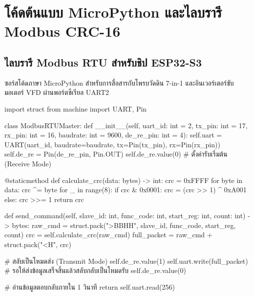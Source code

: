 \renewcommand{\thechapter}{ข}
\chapter{โค้ดต้นแบบ MicroPython และไลบรารี Modbus CRC-16}
\label{chap:appendixB}

\section{ไลบรารี Modbus RTU สำหรับชิป ESP32-S3}

ซอร์สโค้ดภาษา MicroPython สำหรับการสื่อสารกับโพรบวัดดิน 7-in-1 และอินเวอร์เตอร์ขับมอเตอร์ VFD ผ่านพอร์ตซีเรียล UART2

\begin{pythonbox}
import struct
from machine import UART, Pin

class ModbusRTUMaster:
    def __init__(self, uart_id: int = 2, tx_pin: int = 17, rx_pin: int = 16, 
                 baudrate: int = 9600, de_re_pin: int = 4):
        self.uart = UART(uart_id, baudrate=baudrate, tx=Pin(tx_pin), rx=Pin(rx_pin))
        self.de_re = Pin(de_re_pin, Pin.OUT)
        self.de_re.value(0) # ตั้งค่ารับเริ่มต้น (Receive Mode)

    @staticmethod
    def calculate_crc(data: bytes) -> int:
        crc = 0xFFFF
        for byte in data:
            crc ^= byte
            for _ in range(8):
                if crc & 0x0001:
                    crc = (crc >> 1) ^ 0xA001
                else:
                    crc >>= 1
        return crc

    def send_command(self, slave_id: int, func_code: int, start_reg: int, count: int) -> bytes:
        raw_cmd = struct.pack(">BBHH", slave_id, func_code, start_reg, count)
        crc = self.calculate_crc(raw_cmd)
        full_packet = raw_cmd + struct.pack("<H", crc)
        
        # สลับเป็นโหมดส่ง (Transmit Mode)
        self.de_re.value(1)
        self.uart.write(full_packet)
        # รอให้ส่งข้อมูลเสร็จสิ้นแล้วสลับกลับเป็นโหมดรับ
        self.de_re.value(0)
        
        # อ่านข้อมูลตอบกลับภายใน 1 วินาที
        return self.uart.read(256)
\end{pythonbox}
\clearpage

